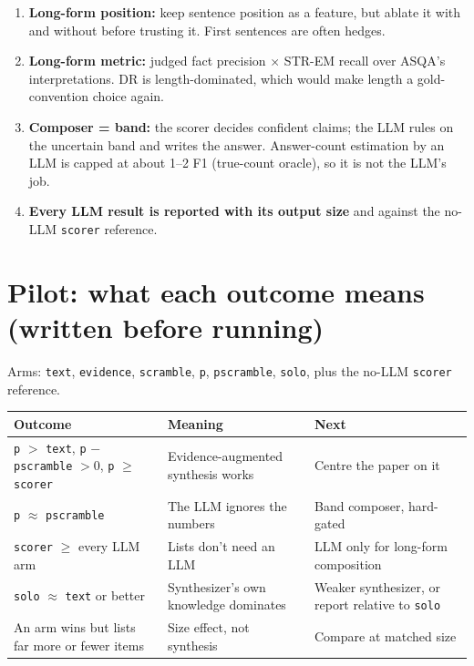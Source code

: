 \documentclass[11pt]{article}
\newcommand{\code}[1]{\texttt{#1}}
\begin{document}
\begin{enumerate}
\begin{itemize}
        \end{itemize}
  \item \textbf{Long-form position:} keep sentence position as a feature, but
        ablate it with and without before trusting it. First sentences are often
        hedges.
  \item \textbf{Long-form metric:} judged fact precision $\times$ STR-EM recall
        over ASQA's interpretations. DR is length-dominated, which would make
        length a gold-convention choice again.
  \item \textbf{Composer = band:} the scorer decides confident claims; the LLM
        rules on the uncertain band and writes the answer. Answer-count
        estimation by an LLM is capped at about 1--2 F1 (true-count oracle), so
        it is not the LLM's job.
  \item \textbf{Every LLM result is reported with its output size} and against
        the no-LLM \code{scorer} reference.
\end{enumerate}

\section{Pilot: what each outcome means (written before running)}\label{sec:pilot}

Arms: \code{text}, \code{evidence}, \code{scramble}, \code{p},
\code{pscramble}, \code{solo}, plus the no-LLM \code{scorer} reference.

\begin{center}
\small
\begin{tabularx}{\linewidth}{LLL}
\toprule
Outcome & Meaning & Next \\
\midrule
\code{p} $>$ \code{text}, \code{p} $-$ \code{pscramble} $>0$, \code{p} $\ge$ \code{scorer}
  & Evidence-augmented synthesis works & Centre the paper on it \\
\code{p} $\approx$ \code{pscramble} & The LLM ignores the numbers & Band composer, hard-gated \\
\code{scorer} $\ge$ every LLM arm & Lists don't need an LLM & LLM only for long-form composition \\
\code{solo} $\approx$ \code{text} or better & Synthesizer's own knowledge dominates & Weaker synthesizer, or report relative to \code{solo} \\
An arm wins but lists far more or fewer items & Size effect, not synthesis & Compare at matched size \\
\bottomrule
\end{tabularx}
\end{center}
\end{document}
